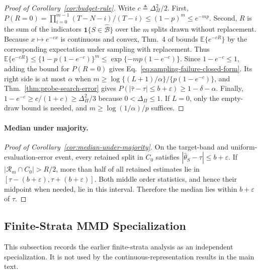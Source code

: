 \begin{proof}[Proof of Corollary~\ref{cor:budget-rule}]
Write $c\triangleq\Delta_\Pi^2/2$. First, $P(R=0)=\prod_{i=0}^{m-1}(T-N-i)/(T-i)\le(1-p)^m\le e^{-mp}$. Second, $R$ is the sum of the indicators $\mathbf 1\{S\in\widehat{\mathcal B}\}$ over the $m$ splits drawn without replacement. Because $x\mapsto e^{-cx}$ is continuous and convex, Thm.~4 of \citet{hoeffding1963probability} bounds $\mathbb E\{e^{-cR}\}$ by the corresponding expectation under sampling with replacement. Thus $\mathbb E\{e^{-cR}\}\le\{1-p(1-e^{-c})\}^m\le\exp\{-mp(1-e^{-c})\}$. Since $1-e^{-c}\le1$, adding the bound for $P(R=0)$ gives Eq.~\eqref{eq:sampling-failure-closed-form}. Its right side is at most $\alpha$ when $m\ge\log\{(L+1)/\alpha\}/\{p(1-e^{-c})\}$, and Thm.~\ref{thm:probe-search-error} gives $P(|\widehat\tau-\tau|\le b+\varepsilon)\ge1-\delta-\alpha$. Finally, $1-e^{-c}\ge c/(1+c)\ge\Delta_\Pi^2/3$ because $0<\Delta_\Pi\le1$. If $L=0$, only the empty-draw bound is needed, and $m\ge\log(1/\alpha)/p$ suffices.
\end{proof}

\paragraph{Median under majority.}
\begin{proof}[Proof of Corollary~\ref{cor:median-under-majority}]
On the target-band and uniform-evaluation-error event, every retained split in $C_0$ satisfies $|\widehat\theta_S-\tau|\le b+\varepsilon$. If $|\mathcal R_m\cap C_0|>R/2$, more than half of all retained estimates lie in $[\tau-(b+\varepsilon),\tau+(b+\varepsilon)]$. Both middle order statistics, and hence their midpoint when needed, lie in this interval. Therefore the median lies within $b+\varepsilon$ of $\tau$.
\end{proof}

\subsection{Finite-Strata MMD Specialization}
\label{app:finite-strata-mmd-specialization}

This subsection records the earlier finite-strata analysis as an independent specialization. It is not used by the continuous-representation results in the main text.

